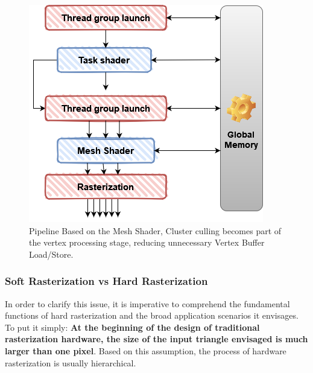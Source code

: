 \documentclass[10pt,journal,compsoc]{IEEEtran}
\begin{document}
\begin{figure}[H]
    \centering
    \includegraphics[scale=0.26]{img/diagram2.png}
    \caption{Pipeline Based on the Mesh Shader, Cluster culling becomes part of the vertex processing stage, reducing unnecessary Vertex Buffer Load/Store.}
    \label{fig:diagram12}
\end{figure}



\subsubsection{Soft Rasterization vs Hard Rasterization}\label{sec:rast}

\par In order to clarify this issue, it is imperative to comprehend the fundamental functions of hard rasterization and the broad application scenarios it envisages. To put it simply: \textbf{At the beginning of the design of traditional rasterization hardware, the size of the input triangle envisaged is much larger than one pixel}. Based on this assumption, the process of hardware rasterization is usually hierarchical.
\end{document}

